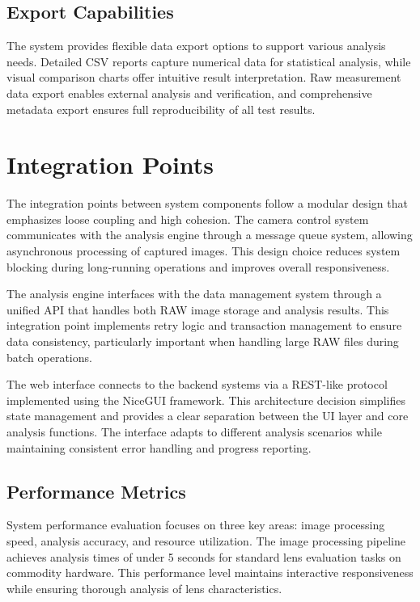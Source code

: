 \subsection{Export Capabilities}
The system provides flexible data export options to support various analysis needs. Detailed CSV reports capture numerical data for statistical analysis, while visual comparison charts offer intuitive result interpretation. Raw measurement data export enables external analysis and verification, and comprehensive metadata export ensures full reproducibility of all test results.

\section{Integration Points} %
The integration points between system components follow a modular design that emphasizes loose coupling and high cohesion. The camera control system communicates with the analysis engine through a message queue system, allowing asynchronous processing of captured images. This design choice reduces system blocking during long-running operations and improves overall responsiveness.

The analysis engine interfaces with the data management system through a unified API that handles both RAW image storage and analysis results. This integration point implements retry logic and transaction management to ensure data consistency, particularly important when handling large RAW files during batch operations.

The web interface connects to the backend systems via a REST-like protocol implemented using the NiceGUI framework. This architecture decision simplifies state management and provides a clear separation between the UI layer and core analysis functions. The interface adapts to different analysis scenarios while maintaining consistent error handling and progress reporting.

\subsection{Performance Metrics}
System performance evaluation focuses on three key areas: image processing speed, analysis accuracy, and resource utilization. The image processing pipeline achieves analysis times of under 5 seconds for standard lens evaluation tasks on commodity hardware. This performance level maintains interactive responsiveness while ensuring thorough analysis of lens characteristics.

